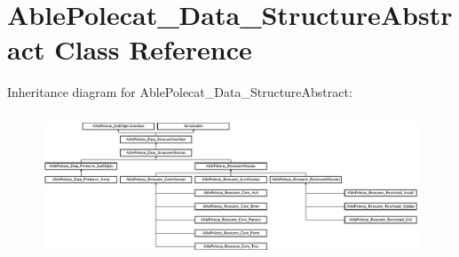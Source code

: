 \hypertarget{class_able_polecat___data___structure_abstract}{}\section{Able\+Polecat\+\_\+\+Data\+\_\+\+Structure\+Abstract Class Reference}
\label{class_able_polecat___data___structure_abstract}
Inheritance diagram for Able\+Polecat\+\_\+\+Data\+\_\+\+Structure\+Abstract\+:\begin{figure}[H]
\begin{center}
\leavevmode
\includegraphics[height=4.324324cm]{class_able_polecat___data___structure_abstract}
\end{center}
\end{figure}

